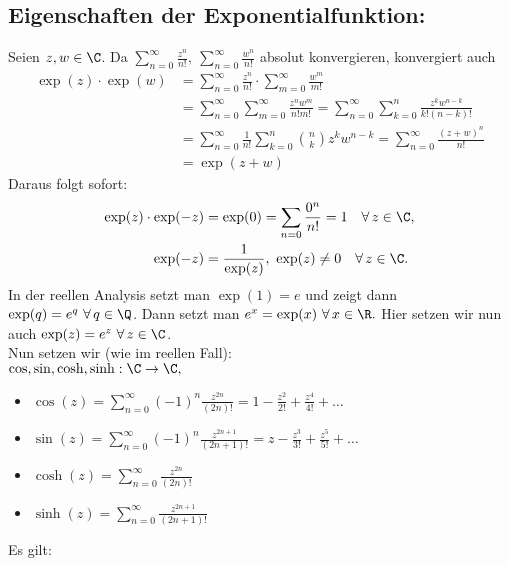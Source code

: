 		\subsection*{Eigenschaften der Exponentialfunktion:}
		Seien $z,w \in \C$. Da $ \sum\limits_{n=0}^\infty \frac{z^n}{n!},\ \sum\limits_{n=0}^\infty \frac{w^n}{n!} $ absolut konvergieren, konvergiert auch
		\begin{align*}
			\exp(z) \cdot \exp(w) &= \sum_{n=0}^\infty \frac{z^n}{n!} \cdot \sum_{m=0}^\infty \frac{w^m}{m!}\\
			&= \sum_{n=0}^\infty \sum_{m=0}^\infty \frac{z^nw^m}{n!m!} = \sum_{n=0}^\infty \sum_{k=0}^n \frac{z^kw^{n-k}}{k!(n-k)!}\\
			&= \sum_{n=0}^\infty \frac{1}{n!} \sum_{k=0}^n \binom{n}{k} z^kw^{n-k} = \sum_{n=0}^\infty \frac{(z+w)^n}{n!}\\
			&= \exp(z+w)
		\end{align*}
		Daraus folgt sofort:
		\begin{align*}
			\exp(z) \cdot \exp(-z) &= \exp(0) = \sum_{n=0} \frac{0^n}{n!} = 1 \quad \forall\, z \in \C,\\
			\exp(-z) &= \frac{1}{\exp(z)},\ \exp(z) \neq 0 \quad \forall\, z \in \C.
		\end{align*}
		In der reellen Analysis setzt man $\exp(1)=e$ und zeigt dann $ \exp(q) = e^q \ \forall\, q \in \Q $. Dann setzt man $ e^x = \exp(x) \ \forall\, x \in \R. $ Hier setzen wir nun auch $ \exp(z) = e^z \ \forall\, z \in \C $.\\
		Nun setzen wir (wie im reellen Fall):\\
		$ \cos,\sin,\cosh,\sinh : \C \to \C, $
		\begin{itemize}
			\item $ \cos(z) = \sum\limits_{n=0}^\infty (-1)^n \frac{z^{2n}}{(2n)!} = 1-\frac{z^2}{2!} + \frac{z^4}{4!} + \dots $
			\item $ \sin(z) = \sum\limits_{n=0}^\infty (-1)^n \frac{z^{2n+1}}{(2n+1)!} = z - \frac{z^3}{3!} + \frac{z^5}{5!} + \dots $
			\item $ \cosh(z) = \sum\limits_{n=0}^\infty \frac{z^{2n}}{(2n)!} $
			\item $ \sinh(z) = \sum\limits_{n=0}^\infty \frac{z^{2n+1}}{(2n+1)!} $
		\end{itemize}
		Es gilt:
